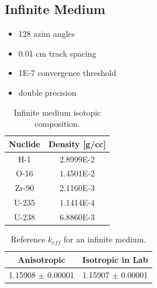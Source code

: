 \subsection{Infinite Medium}
\label{subsec:chap4-inf-medium}

\begin{itemize}[noitemsep]
\item 128 azim angles
\item 0.01 cm track spacing
\item 1E-7 convergence threshold
\item double precision
\end{itemize}

\begin{table}[h!]
  \centering
  \caption{Infinite medium isotopic composition.}
  \label{table:chap2-inf-med-isotopes} 
  \vspace{14pt}
  \begin{tabular}{c c}
  \toprule
  \multicolumn{1}{c}{\bf Nuclide} &
  \multicolumn{1}{c}{\bf Density [g/cc]} \\
  \midrule
  H-1 & 2.8999E-2 \\
  O-16 & 1.4501E-2 \\
  Zr-90 & 2.1160E-3 \\  
  U-235 & 1.1414E-4 \\
  U-238 & 6.8860E-3 \\
  \bottomrule
\end{tabular}
\end{table}

\begin{table}[h!]
  \centering
  \caption{Reference $k_{eff}$ for an infinite medium.}
  \label{table:chap2-inf-med-reference} 
  \vspace{14pt}
  \begin{tabular}{c c}
  \toprule
  \multicolumn{1}{c}{\bf Anisotropic} &
  \multicolumn{1}{c}{\bf Isotropic in Lab} \\
  \midrule
  1.15908 $\pm$ 0.00001 & 1.15907 $\pm$ 0.00001 \\
  \bottomrule
\end{tabular}
\end{table}

